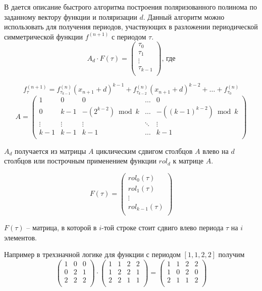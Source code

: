\documentclass[bibliography=totoc, a4paper, 14pt]{extarticle}
\begin{document}
В \cite{sm09} дается описание быстрого алгоритма построения поляризованного полинома по заданному вектору
функции и поляризации $d$. Данный алгоритм можно использовать для получения периодов, участвующих в разложении
периодической симметрической функции $f^{(n+1)}$ с периодом $\tau$. 
$$A_d \cdot F(\tau) = \begin{pmatrix}
\tau_0 \\
\tau_1 \\
\vdots \\
\tau_{k-1} \\
\end{pmatrix} \text{, где}
$$

\begin{equation}
\label{deg}
f_{\tau}^{(n+1)} = f_{\tau_{k-1}}^{(n)}(x_{n+1}+d)^{k-1} + f_{\tau_{k-2}}^{(n)}(x_{n+1}+d)^{k-2} + \ldots + f_{\tau_{0}}^{(n)}
\end{equation}
$$
A = \begin{pmatrix}
1      & 0      & 0                  & \ldots & 0                      \\
0      & k-1    & -(2^{k-2}) \bmod k & \ldots & -((k-1)^{k-2}) \bmod k \\
\vdots & \vdots &  \vdots            & \ddots & \vdots                 \\
k-1    & k-1    & k-1                & \ldots & k-1                    \\
\end{pmatrix}
$$

$A_d$ получается из матрицы $A$ циклическим сдвигом столбцов $A$ влево на $d$ столбцов или построчным применением
функции $rol_d$ к матрице $A$.

$$
F(\tau) = \begin{pmatrix}
rol_0(\tau)     \\
rol_1(\tau)     \\
\vdots          \\
rol_{k-1}(\tau) \\
\end{pmatrix}
$$

$F(\tau)$ -- матрица, в которой в $i$-той строке стоит сдвиго влево периода $\tau$ на $i$ элементов.

Например в трехзначной логике для функции с периодом $[1,1,2,2]$ получим
$$
\begin{pmatrix}
1 & 0 & 0 \\
0 & 2 & 1 \\
2 & 2 & 2 \\
\end{pmatrix}
\cdot
\begin{pmatrix}
1 & 1 & 2 & 2 \\
1 & 2 & 2 & 1 \\
2 & 2 & 1 & 1 \\
\end{pmatrix}
=
\begin{pmatrix}
1 & 1 & 2 & 2 \\
1 & 0 & 2 & 0 \\
2 & 1 & 1 & 2 \\
\end{pmatrix}
$$
\end{document}
